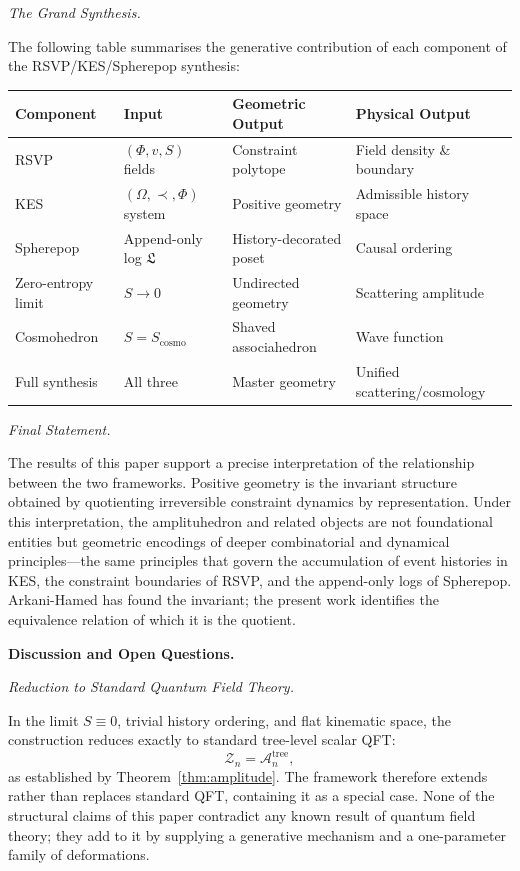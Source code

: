 \documentclass[11pt]{article}
\theoremstyle{plain}
\theoremstyle{definition}
\theoremstyle{remark}
\newcommand{\Phif}{\Phi}
\newcommand{\vf}{v}
\newcommand{\Sf}{S}
\newcommand{\OmKS}{\Omega}
\newcommand{\Log}{\mathfrak{L}}
\begin{document}
\medskip\noindent\textit{The Grand Synthesis.}

The following table summarises the generative contribution of each component of the RSVP/KES/Spherepop synthesis:

\begin{center}
\begin{tabular}{llll}
\toprule
Component & Input & Geometric Output & Physical Output \\
\midrule
RSVP & $(\Phif, \vf, \Sf)$ fields & Constraint polytope & Field density \& boundary \\
KES & $(\OmKS, \prec, \Phif)$ system & Positive geometry & Admissible history space \\
Spherepop & Append-only log $\Log$ & History-decorated poset & Causal ordering \\
Zero-entropy limit & $\Sf \to 0$ & Undirected geometry & Scattering amplitude \\
Cosmohedron & $\Sf = \Sf_{\mathrm{cosmo}}$ & Shaved associahedron & Wave function \\
Full synthesis & All three & Master geometry & Unified scattering/cosmology \\
\bottomrule
\end{tabular}
\end{center}

\medskip\noindent\textit{Final Statement.}

The results of this paper support a precise interpretation of the relationship between the two frameworks. Positive geometry is the invariant structure obtained by quotienting irreversible constraint dynamics by representation. Under this interpretation, the amplituhedron and related objects are not foundational entities but geometric encodings of deeper combinatorial and dynamical principles---the same principles that govern the accumulation of event histories in KES, the constraint boundaries of RSVP, and the append-only logs of Spherepop. Arkani-Hamed has found the invariant; the present work identifies the equivalence relation of which it is the quotient.

\bigskip\noindent\textbf{Discussion and Open Questions.}
\label{sec:discussion}

\medskip\noindent\textit{Reduction to Standard Quantum Field Theory.}

In the limit $\Sf \equiv 0$, trivial history ordering, and flat kinematic space, the construction reduces exactly to standard tree-level scalar QFT:
\[
  \mathcal{Z}_n = \mathcal{A}_n^{\mathrm{tree}},
\]
as established by Theorem~\ref{thm:amplitude}. The framework therefore extends rather than replaces standard QFT, containing it as a special case. None of the structural claims of this paper contradict any known result of quantum field theory; they add to it by supplying a generative mechanism and a one-parameter family of deformations.
\end{document}
